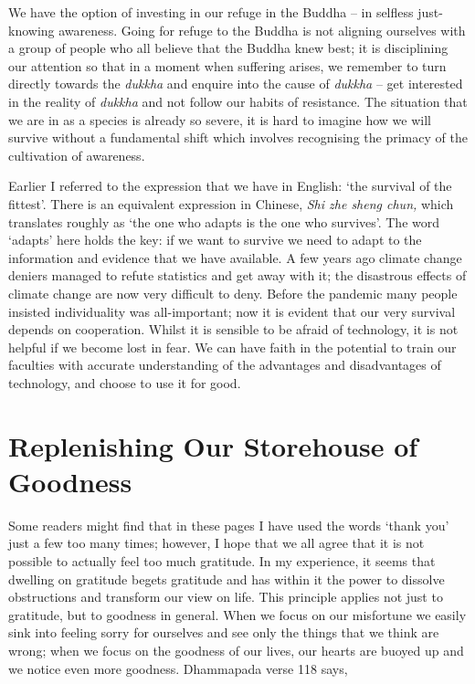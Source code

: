 We have the option of investing in our refuge in the Buddha -- in
selfless just-knowing awareness. Going for refuge to the Buddha is not
aligning ourselves with a group of people who all believe that the
Buddha knew best; it is disciplining our attention so that in a moment
when suffering arises, we remember to turn directly towards the
\emph{dukkha} and enquire into the cause of \emph{dukkha} -- get
interested in the reality of \emph{dukkha} and not follow our habits of
resistance. The situation that we are in as a species is already so
severe, it is hard to imagine how we will survive without a fundamental
shift which involves recognising the primacy of the cultivation of
awareness.

Earlier I referred to the expression that we have in English: `the
survival of the fittest'. There is an equivalent expression in Chinese,
\emph{Shi zhe sheng chun,} which translates roughly as `the one who
adapts is the one who survives'. The word `adapts' here holds the key:
if we want to survive we need to adapt to the information and evidence
that we have available. A few years ago climate change deniers managed
to refute statistics and get away with it; the disastrous effects of
climate change are now very difficult to deny. Before the pandemic many
people insisted individuality was all-important; now it is evident that
our very survival depends on cooperation. Whilst it is sensible to be
afraid of technology, it is not helpful if we become lost in fear. We
can have faith in the potential to train our faculties with accurate
understanding of the advantages and disadvantages of technology, and
choose to use it for good.

\section{Replenishing Our Storehouse of Goodness}

Some readers might find that in these pages I have used the words `thank
you' just a few too many times; however, I hope that we all agree that
it is not possible to actually feel too much gratitude. In my
experience, it seems that dwelling on gratitude begets gratitude and has within it the
power to dissolve obstructions and transform our view on life. This
principle applies not just to gratitude, but to goodness in general.
When we focus on our misfortune we easily sink into feeling sorry for
ourselves and see only the things that we think are wrong; when we focus
on the goodness of our lives, our hearts are buoyed up and we notice
even more goodness. Dhammapada verse 118 says,

